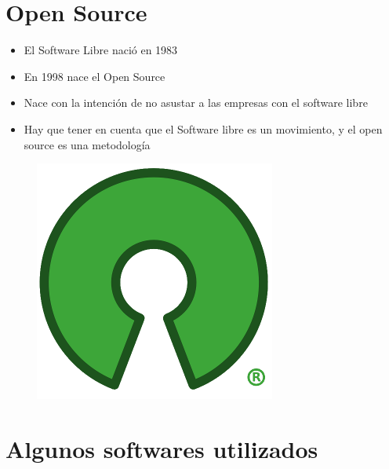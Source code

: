\documentclass[spanish]{beamer}
\begin{document}
\section{Open Source}
\begin{frame}
	\begin{multicols}{2}
		\begin{itemize}
			\item El Software Libre nació en 1983
			\item En 1998 nace el Open Source
			\item Nace con la intención de no asustar a las empresas con el software libre
			\item Hay que tener en cuenta que el Software libre es un movimiento, y el open source es una metodología
		\end{itemize}
	\begin{figure}
		\centering
		\includegraphics[width=0.7\linewidth]{Opensource}
	\end{figure}
	\end{multicols}
\end{frame}
\section{Algunos softwares utilizados}
\end{document}
